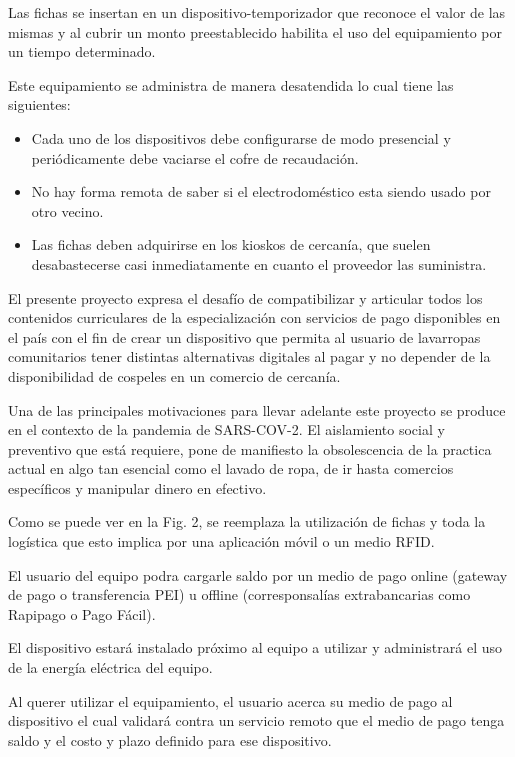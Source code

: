 \documentclass[11pt]{charter}
\begin{document}
Las fichas se insertan en un dispositivo-temporizador que reconoce el valor de las mismas y al cubrir un monto preestablecido habilita el uso del equipamiento por un tiempo determinado. 

Este equipamiento se administra de manera desatendida lo cual tiene las siguientes: 

\begin{itemize}
\item Cada uno de los dispositivos debe configurarse de modo presencial y periódicamente debe vaciarse el cofre de recaudación.

\item No hay forma remota de saber si el electrodoméstico esta siendo usado por otro vecino.
\item Las fichas deben adquirirse en los kioskos de cercanía, que suelen desabastecerse casi inmediatamente en cuanto el proveedor las suministra.
\end{itemize}


El presente proyecto expresa el desafío de compatibilizar y articular todos los contenidos curriculares de la especialización con servicios de pago disponibles en el país con el fin de crear un dispositivo que permita al usuario de lavarropas comunitarios tener distintas alternativas digitales al pagar y no depender de la disponibilidad de cospeles en un comercio de cercanía. 
 

Una de las principales motivaciones para llevar adelante este proyecto se produce en el contexto de la pandemia de SARS-COV-2. El aislamiento social y preventivo que está requiere, pone de manifiesto la obsolescencia de la practica actual en algo tan esencial como el lavado de ropa, de ir hasta comercios específicos y manipular dinero en efectivo.  

Como se puede ver en la Fig. 2, se reemplaza la utilización de fichas y toda la logística que esto implica por una aplicación móvil o un medio RFID.

El usuario del equipo podra cargarle saldo por un medio de pago online (gateway de pago o transferencia PEI) u offline (corresponsalías extrabancarias como Rapipago o Pago Fácil).

El dispositivo estará instalado próximo al equipo a utilizar y administrará el uso de la energía eléctrica del equipo.

Al querer utilizar el equipamiento, el usuario acerca su medio de pago al dispositivo el cual validará contra un servicio remoto que el medio de pago tenga saldo y el costo y plazo definido para ese dispositivo.
\end{document}

